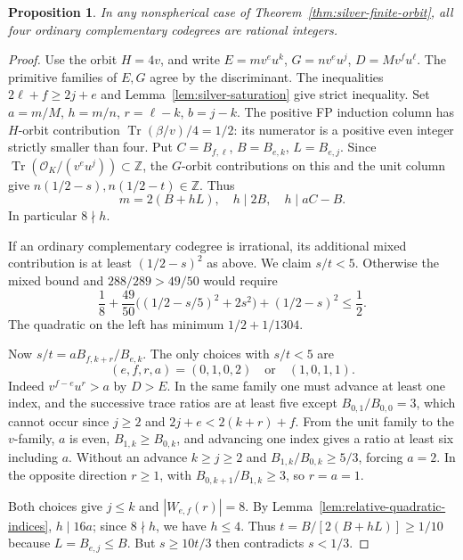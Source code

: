 \documentclass[11pt,reqno]{amsart}
\newtheorem{proposition}[theorem]{Proposition}
\theoremstyle{remark}\newtheorem{remark}[theorem]{Remark}
\numberwithin{equation}{section}
\begin{document}
\begin{proposition}\label{prop:silver-ordinary-rational}
In any nonspherical case of Theorem~\ref{thm:silver-finite-orbit},
all four ordinary complementary codegrees are rational integers.
\end{proposition}
\begin{proof}
Use the orbit $H=4v$, and write $E=mv^eu^k$, $G=nv^eu^j$,
$D=Mv^fu^\ell$. The primitive families of $E,G$ agree by the
discriminant. The inequalities $2\ell+f\ge2j+e$ and
Lemma~\ref{lem:silver-saturation} give strict inequality.
Set $a=m/M$, $h=m/n$, $r=\ell-k$, $b=j-k$.
The positive FP induction column has $H$-orbit contribution
$\operatorname{Tr}(\beta/v)/4=1/2$: its numerator is a positive
even integer strictly smaller than four. Put $C=B_{f,\ell}$,
$B=B_{e,k}$, $L=B_{e,j}$. Since
$\operatorname{Tr}(\mathcal O_K/(v^eu^j))\subset\mathbb Z$,
the $G$-orbit contributions on this and the unit column give
$n(1/2-s),n(1/2-t)\in\mathbb Z$. Thus
\[
  m=2(B+hL),\quad h\mid2B,\quad h\mid aC-B.
\]
In particular $8\nmid h$.

If an ordinary complementary codegree is irrational, its additional
mixed contribution is at least $(1/2-s)^2$ as above. We claim $s/t<5$.
Otherwise the mixed bound and $288/289>49/50$ would require
\[
 \frac18+\frac{49}{50}\bigl((1/2-s/5)^2+2s^2\bigr)
          +(1/2-s)^2\le\frac12 .
\]
The quadratic on the left has minimum $1/2+1/1304$.

Now $s/t=aB_{f,k+r}/B_{e,k}$. The only choices with $s/t<5$ are
\[
       (e,f,r,a)=(0,1,0,2)\quad\text{or}\quad(1,0,1,1).
\]
Indeed $v^{f-e}u^r>a$ by $D>E$. In the same family one must advance
at least one index, and the successive trace ratios are at least
five except $B_{0,1}/B_{0,0}=3$, which cannot occur since $j\ge2$
and $2j+e<2(k+r)+f$. From the unit family to the $v$-family,
$a$ is even, $B_{1,k}\ge B_{0,k}$, and advancing one index gives
a ratio at least six including $a$. Without an advance $k\ge j\ge2$
and $B_{1,k}/B_{0,k}\ge5/3$, forcing $a=2$. In the opposite direction
$r\ge1$, with $B_{0,k+1}/B_{1,k}\ge3$, so $r=a=1$.

Both choices give $j\le k$ and $|W_{e,f}(r)|=8$. By
Lemma~\ref{lem:relative-quadratic-indices}, $h\mid16a$; since
$8\nmid h$, we have $h\le4$. Thus
$t=B/[2(B+hL)]\ge1/10$ because $L=B_{e,j}\le B$.
But $s\ge10t/3$ then contradicts $s<1/3$.
\end{proof}
\end{document}
